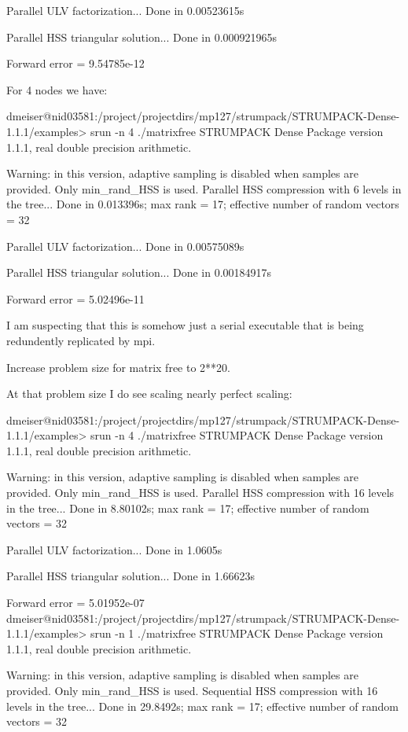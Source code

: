 \documentclass{acmsmall}
\begin{document}
Parallel ULV factorization...
Done in 0.00523615s

Parallel HSS triangular solution...
Done in 0.000921965s

Forward error = 9.54785e-12


For 4 nodes we have:


dmeiser@nid03581:/project/projectdirs/mp127/strumpack/STRUMPACK-Dense-1.1.1/examples>
srun -n 4 ./matrixfree
STRUMPACK Dense Package version 1.1.1, real double precision arithmetic.

Warning: in this version, adaptive sampling is disabled when samples are
provided. Only min_rand_HSS is used.
Parallel HSS compression with 6 levels in the tree...
Done in 0.013396s; max rank = 17; effective number of random vectors =
32

Parallel ULV factorization...
Done in 0.00575089s

Parallel HSS triangular solution...
Done in 0.00184917s

Forward error = 5.02496e-11


I am suspecting that this is somehow just a serial executable that is
being redundently replicated by mpi.



Increase problem size for matrix free to 2**20.

At that problem size I do see scaling nearly perfect scaling:

dmeiser@nid03581:/project/projectdirs/mp127/strumpack/STRUMPACK-Dense-1.1.1/examples>
srun -n 4 ./matrixfree
STRUMPACK Dense Package version 1.1.1, real double precision arithmetic.

Warning: in this version, adaptive sampling is disabled when samples are
provided. Only min_rand_HSS is used.
Parallel HSS compression with 16 levels in the tree...
Done in 8.80102s; max rank = 17; effective number of random vectors = 32

Parallel ULV factorization...
Done in 1.0605s

Parallel HSS triangular solution...
Done in 1.66623s

Forward error = 5.01952e-07
dmeiser@nid03581:/project/projectdirs/mp127/strumpack/STRUMPACK-Dense-1.1.1/examples>
srun -n 1 ./matrixfree
STRUMPACK Dense Package version 1.1.1, real double precision arithmetic.

Warning: in this version, adaptive sampling is disabled when samples are
provided. Only min_rand_HSS is used.
Sequential HSS compression with 16 levels in the tree...
Done in 29.8492s; max rank = 17; effective number of random vectors = 32
\end{document}
